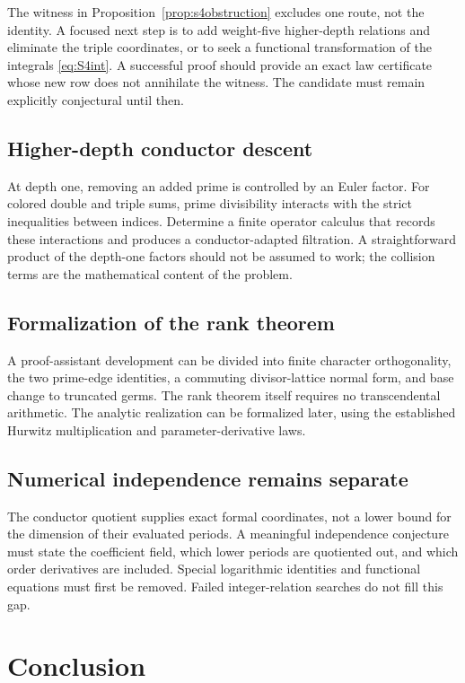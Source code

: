 \documentclass[11pt]{article}
\numberwithin{equation}{section}
\theoremstyle{definition}\newtheorem{definition}[theorem]{Definition}
\theoremstyle{remark}\newtheorem{remark}[theorem]{Remark}
\begin{document}
The witness in Proposition~\ref{prop:s4obstruction} excludes one route, not
the identity. A focused next step is to add weight-five higher-depth
relations and eliminate the triple coordinates, or to seek a functional
transformation of the integrals \eqref{eq:S4int}. A successful proof should
provide an exact law certificate whose new row does not annihilate the
witness. The candidate must remain explicitly conjectural until then.

\subsection{Higher-depth conductor descent}

At depth one, removing an added prime is controlled by an Euler factor.
For colored double and triple sums, prime divisibility interacts with the
strict inequalities between indices. Determine a finite operator calculus
that records these interactions and produces a conductor-adapted filtration.
A straightforward product of the depth-one factors should not be assumed
to work; the collision terms are the mathematical content of the problem.

\subsection{Formalization of the rank theorem}

A proof-assistant development can be divided into finite character
orthogonality, the two prime-edge identities, a commuting divisor-lattice
normal form, and base change to truncated germs. The rank theorem itself
requires no transcendental arithmetic. The analytic realization can be
formalized later, using the established Hurwitz multiplication and
parameter-derivative laws.

\subsection{Numerical independence remains separate}

The conductor quotient supplies exact formal coordinates, not a lower
bound for the dimension of their evaluated periods. A meaningful
independence conjecture must state the coefficient field, which lower
periods are quotiented out, and which order derivatives are included.
Special logarithmic identities and functional equations must first be
removed. Failed integer-relation searches do not fill this gap.

\section{Conclusion}
\end{document}
